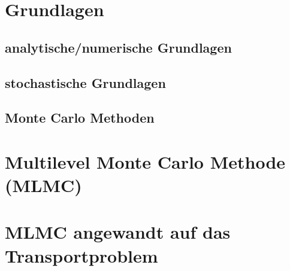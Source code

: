 \documentclass[12pt,a4paper]{scrartcl}
\numberwithin{equation}{section}
\begin{document}
 \newpage  %
 
\section{Grundlagen}
\subsection{analytische/numerische Grundlagen}
\subsection{stochastische Grundlagen}
\subsection{Monte Carlo Methoden}
\section{Multilevel Monte Carlo Methode (MLMC)}
\section{MLMC angewandt auf das Transportproblem}
\end{document}
